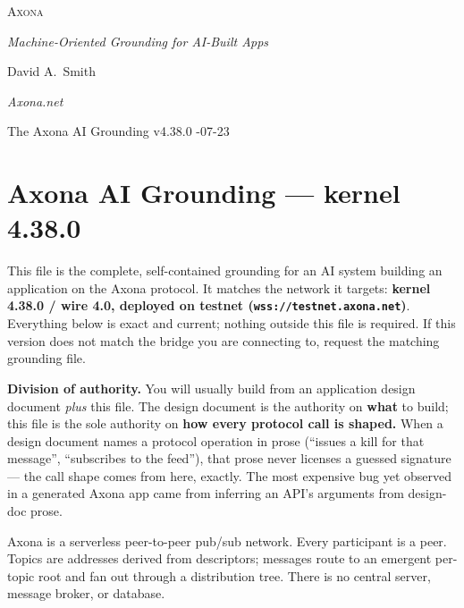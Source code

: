 \documentclass[
  nobib]{tufte-handout}
\author{}
\date{}
\begin{document}
\thispagestyle{empty}
\null\vfill
\begin{center}
{\fontsize{48}{52}\selectfont \textsc{Axona}\par}
\vspace{0.6em}
{\Large\itshape Machine-Oriented Grounding for AI-Built Apps\par}
\vspace{4em}
{\large David A.~Smith\par}
{\itshape\small Axona.net\par}
\vspace{2em}
{\small The Axona AI Grounding \quad v4.38.0 -07-23\par}
\end{center}
\vfill
\null
\newpage
\pagestyle{ndhtplain}
\thispagestyle{ndhtplain}
\setcounter{page}{1}

\section{Axona AI Grounding --- kernel
4.38.0}\label{axona-ai-grounding-kernel-4.38.0}

This file is the complete, self-contained grounding for an AI system
building an application on the Axona protocol. It matches the network it
targets: \textbf{kernel 4.38.0 / wire 4.0, deployed on testnet
(\texttt{wss://testnet.axona.net})}. Everything below is exact and
current; nothing outside this file is required. If this version does not
match the bridge you are connecting to, request the matching grounding
file.

\textbf{Division of authority.} You will usually build from an
application design document \emph{plus} this file. The design document
is the authority on \textbf{what} to build; this file is the sole
authority on \textbf{how every protocol call is shaped.} When a design
document names a protocol operation in prose (``issues a kill for that
message'', ``subscribes to the feed''), that prose never licenses a
guessed signature --- the call shape comes from here, exactly. The most
expensive bug yet observed in a generated Axona app came from inferring
an API's arguments from design-doc prose.

Axona is a serverless peer-to-peer pub/sub network. Every participant is
a peer. Topics are addresses derived from descriptors; messages route to
an emergent per-topic root and fan out through a distribution tree.
There is no central server, message broker, or database.
\end{document}

